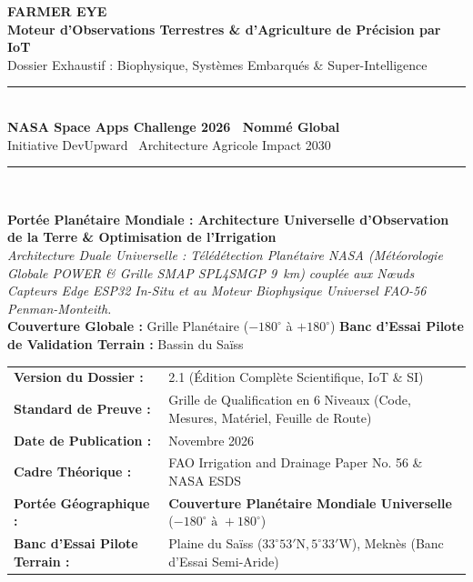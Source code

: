 \documentclass[11pt,a4paper,oneside]{report}
\begin{document}
\begin{titlepage}
    \centering
    \vspace*{1.5cm}
    
    {\Huge \bfseries \color{nasablue} FARMER EYE}\\[0.4cm]
    {\LARGE \textbf{Moteur d'Observations Terrestres \& d'Agriculture de Précision par IoT}}\\[0.2cm]
    {\large \color{farmergreen} Dossier Exhaustif : Biophysique, Systèmes Embarqués \& Super-Intelligence}\\[1.5cm]
    
    \rule{\linewidth}{1.2pt}\\[0.5cm]
    {\large \textbf{NASA Space Apps Challenge 2026 \textbar\ Nommé Global}}\\[0.2cm]
    {\small Initiative DevUpward \textbar\ Architecture Agricole Impact 2030}\\[0.5cm]
    \rule{\linewidth}{1.2pt}\\[2cm]
    
    \begin{tcolorbox}[enhanced,colback=bglight,colframe=nasablue,arc=3mm,boxrule=1pt,width=0.92\linewidth]
    \centering\small
    \textbf{Portée Planétaire Mondiale : Architecture Universelle d'Observation de la Terre \& Optimisation de l'Irrigation}\\[0.2cm]
    \textit{Architecture Duale Universelle : Télédétection Planétaire NASA (Météorologie Globale POWER \& Grille SMAP SPL4SMGP 9~km) couplée aux Nœuds Capteurs Edge ESP32 In-Situ et au Moteur Biophysique Universel FAO-56 Penman-Monteith.}\\[0.15cm]
    \footnotesize\textbf{Couverture Globale :} Grille Planétaire ($-180^\circ$ à $+180^\circ$) \quad\textbar\quad \textbf{Banc d'Essai Pilote de Validation Terrain :} Bassin du Saïss
    \end{tcolorbox}
    
    \vfill
    
    \begin{tabularx}{0.88\linewidth}{lX}
    \textbf{Version du Dossier :} & 2.1 (Édition Complète Scientifique, IoT \& SI) \\
    \textbf{Standard de Preuve :} & Grille de Qualification en 6 Niveaux (Code, Mesures, Matériel, Feuille de Route) \\
    \textbf{Date de Publication :} & Novembre 2026 \\
    \textbf{Cadre Théorique :} & FAO Irrigation and Drainage Paper No. 56 \& NASA ESDS \\
    \textbf{Portée Géographique :} & \textbf{Couverture Planétaire Mondiale Universelle} ($-180^\circ \text{ à } +180^\circ$) \\
    \textbf{Banc d'Essai Pilote Terrain :} & Plaine du Saïss ($33^\circ 53' \text{N}, 5^\circ 33' \text{W}$), Meknès (Banc d'Essai Semi-Aride) \\
    \end{tabularx}
    
    \vspace*{1cm}
\end{titlepage}
\end{document}
